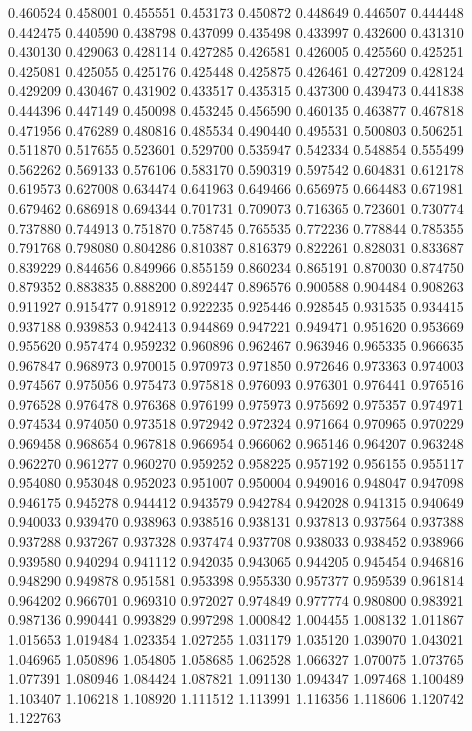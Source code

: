 0.460524
0.458001
0.455551
0.453173
0.450872
0.448649
0.446507
0.444448
0.442475
0.440590
0.438798
0.437099
0.435498
0.433997
0.432600
0.431310
0.430130
0.429063
0.428114
0.427285
0.426581
0.426005
0.425560
0.425251
0.425081
0.425055
0.425176
0.425448
0.425875
0.426461
0.427209
0.428124
0.429209
0.430467
0.431902
0.433517
0.435315
0.437300
0.439473
0.441838
0.444396
0.447149
0.450098
0.453245
0.456590
0.460135
0.463877
0.467818
0.471956
0.476289
0.480816
0.485534
0.490440
0.495531
0.500803
0.506251
0.511870
0.517655
0.523601
0.529700
0.535947
0.542334
0.548854
0.555499
0.562262
0.569133
0.576106
0.583170
0.590319
0.597542
0.604831
0.612178
0.619573
0.627008
0.634474
0.641963
0.649466
0.656975
0.664483
0.671981
0.679462
0.686918
0.694344
0.701731
0.709073
0.716365
0.723601
0.730774
0.737880
0.744913
0.751870
0.758745
0.765535
0.772236
0.778844
0.785355
0.791768
0.798080
0.804286
0.810387
0.816379
0.822261
0.828031
0.833687
0.839229
0.844656
0.849966
0.855159
0.860234
0.865191
0.870030
0.874750
0.879352
0.883835
0.888200
0.892447
0.896576
0.900588
0.904484
0.908263
0.911927
0.915477
0.918912
0.922235
0.925446
0.928545
0.931535
0.934415
0.937188
0.939853
0.942413
0.944869
0.947221
0.949471
0.951620
0.953669
0.955620
0.957474
0.959232
0.960896
0.962467
0.963946
0.965335
0.966635
0.967847
0.968973
0.970015
0.970973
0.971850
0.972646
0.973363
0.974003
0.974567
0.975056
0.975473
0.975818
0.976093
0.976301
0.976441
0.976516
0.976528
0.976478
0.976368
0.976199
0.975973
0.975692
0.975357
0.974971
0.974534
0.974050
0.973518
0.972942
0.972324
0.971664
0.970965
0.970229
0.969458
0.968654
0.967818
0.966954
0.966062
0.965146
0.964207
0.963248
0.962270
0.961277
0.960270
0.959252
0.958225
0.957192
0.956155
0.955117
0.954080
0.953048
0.952023
0.951007
0.950004
0.949016
0.948047
0.947098
0.946175
0.945278
0.944412
0.943579
0.942784
0.942028
0.941315
0.940649
0.940033
0.939470
0.938963
0.938516
0.938131
0.937813
0.937564
0.937388
0.937288
0.937267
0.937328
0.937474
0.937708
0.938033
0.938452
0.938966
0.939580
0.940294
0.941112
0.942035
0.943065
0.944205
0.945454
0.946816
0.948290
0.949878
0.951581
0.953398
0.955330
0.957377
0.959539
0.961814
0.964202
0.966701
0.969310
0.972027
0.974849
0.977774
0.980800
0.983921
0.987136
0.990441
0.993829
0.997298
1.000842
1.004455
1.008132
1.011867
1.015653
1.019484
1.023354
1.027255
1.031179
1.035120
1.039070
1.043021
1.046965
1.050896
1.054805
1.058685
1.062528
1.066327
1.070075
1.073765
1.077391
1.080946
1.084424
1.087821
1.091130
1.094347
1.097468
1.100489
1.103407
1.106218
1.108920
1.111512
1.113991
1.116356
1.118606
1.120742
1.122763

